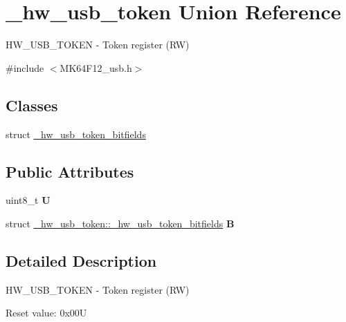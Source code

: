 \hypertarget{union__hw__usb__token}{}\section{\+\_\+hw\+\_\+usb\+\_\+token Union Reference}
\label{union__hw__usb__token}


H\+W\+\_\+\+U\+S\+B\+\_\+\+T\+O\+K\+EN -\/ Token register (RW)  




{\ttfamily \#include $<$M\+K64\+F12\+\_\+usb.\+h$>$}

\subsection*{Classes}
\begin{DoxyCompactItemize}
\item 
struct \hyperlink{struct__hw__usb__token_1_1__hw__usb__token__bitfields}{\+\_\+hw\+\_\+usb\+\_\+token\+\_\+bitfields}
\end{DoxyCompactItemize}
\subsection*{Public Attributes}
\begin{DoxyCompactItemize}
\item 
uint8\+\_\+t {\bfseries U}\hypertarget{union__hw__usb__token_a805e4fd1072114b08a222167e2c3b9cb}{}\label{union__hw__usb__token_a805e4fd1072114b08a222167e2c3b9cb}

\item 
struct \hyperlink{struct__hw__usb__token_1_1__hw__usb__token__bitfields}{\+\_\+hw\+\_\+usb\+\_\+token\+::\+\_\+hw\+\_\+usb\+\_\+token\+\_\+bitfields} {\bfseries B}\hypertarget{union__hw__usb__token_a080e430b9c9a62b3ca8d4760ba41f266}{}\label{union__hw__usb__token_a080e430b9c9a62b3ca8d4760ba41f266}

\end{DoxyCompactItemize}


\subsection{Detailed Description}
H\+W\+\_\+\+U\+S\+B\+\_\+\+T\+O\+K\+EN -\/ Token register (RW) 

Reset value\+: 0x00U

